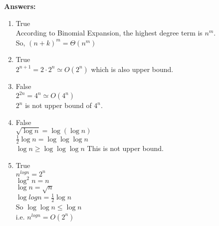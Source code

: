 \documentclass[]{article}
\begin{document}
\textbf{Answers: }
\begin{enumerate}
    \item True\\
    According to Binomial Expansion, the highest degree term is $n^m$. \\
    So, $(n+k)^m = \Theta(n^m)$
    \item True\\
    $2^{n+1} = 2 \cdot 2^n \simeq O(2^n)$ which is also upper bound.
    \item False\\
    $2^{2n} = 4^n \simeq O(4^n)$\\
    $2^n$ is not upper bound of $4^n$.
    \item False\\
    $\sqrt{\log{n}} = \log{(\log{n})}$\\
    $\frac{1}{2}\log{n} = \log{\log{\log{n}}}$\\
    $\log{n} \geq \log{\log{\log{n}}}$ This is not upper bound.
    \item True\\
    $n^{log{n}} = 2^n$\\
    $\log^2{n} = n$\\
    $\log{n} = \sqrt{n}$\\
    $\log{log{n}} = \frac{1}{2}\log{n}$\\
    So $\log{\log{n}} \leq \log{n}$\\
    i.e. $n^{log{n}} = O(2^n)$\\
\end{enumerate}
\end{document}
